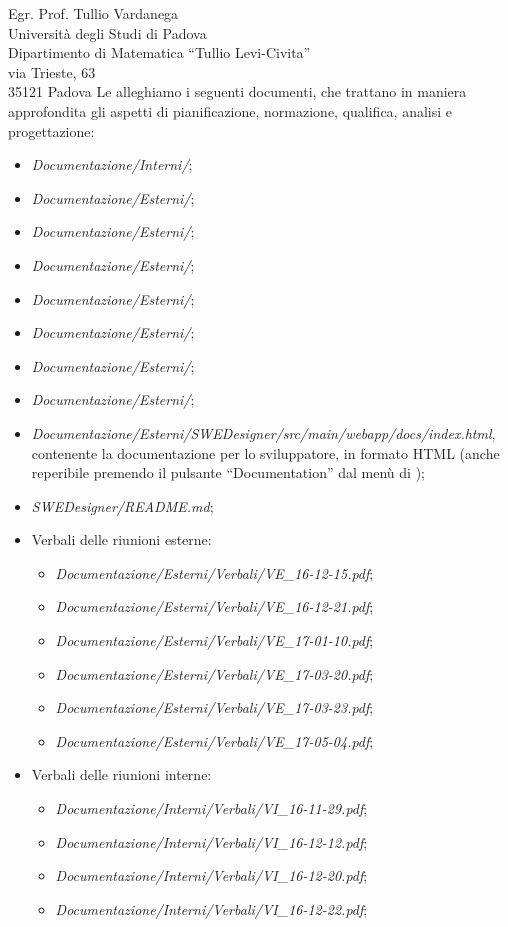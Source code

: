 \documentclass[a4paper]{letter} %
\begin{document}
\begin{letter}{Egr. Prof. Tullio Vardanega\\
Università degli Studi di Padova\\
Dipartimento di Matematica “Tullio Levi-Civita”\\
via Trieste, 63\\
35121 Padova}
Le alleghiamo i seguenti documenti, che trattano in maniera approfondita gli aspetti di pianificazione, normazione, qualifica, analisi e progettazione:
\begin{itemize}
	\item \emph{Documentazione/Interni/}\NdP;
	\item \emph{Documentazione/Esterni/}\PdP;
	\item \emph{Documentazione/Esterni/}\PdQ;
	\item \emph{Documentazione/Esterni/}\AdR;
	\item \emph{Documentazione/Esterni/}\ST;
	\item \emph{Documentazione/Esterni/}\DP;
	\item \emph{Documentazione/Esterni/}\Glossario;
	\item \emph{Documentazione/Esterni/}\MU;
	\item \emph{Documentazione/Esterni/}\emph{SWEDesigner/src/main/webapp/docs/index.html}, contenente la documentazione per lo sviluppatore, in formato HTML (anche reperibile premendo il pulsante “Documentation” dal menù di \proj);
	\item \emph{SWEDesigner/README.md};
	\item Verbali delle riunioni esterne:
	\begin{itemize}
		\item \emph{Documentazione/Esterni/Verbali/}\emph{VE\_16-12-15.pdf};
		\item \emph{Documentazione/Esterni/Verbali/}\emph{VE\_16-12-21.pdf};
		\item \emph{Documentazione/Esterni/Verbali/}\emph{VE\_17-01-10.pdf};
		\item \emph{Documentazione/Esterni/Verbali/}\emph{VE\_17-03-20.pdf};
		\item \emph{Documentazione/Esterni/Verbali/}\emph{VE\_17-03-23.pdf};
		\item \emph{Documentazione/Esterni/Verbali/}\emph{VE\_17-05-04.pdf};
	\end{itemize}
	\item Verbali delle riunioni interne:
	\begin{itemize}
		\item \emph{Documentazione/Interni/Verbali/}\emph{VI\_16-11-29.pdf};
		\item \emph{Documentazione/Interni/Verbali/}\emph{VI\_16-12-12.pdf};
		\item \emph{Documentazione/Interni/Verbali/}\emph{VI\_16-12-20.pdf};
		\item \emph{Documentazione/Interni/Verbali/}\emph{VI\_16-12-22.pdf};

\end{itemize}
\end{itemize}
\end{letter}
\end{document}
